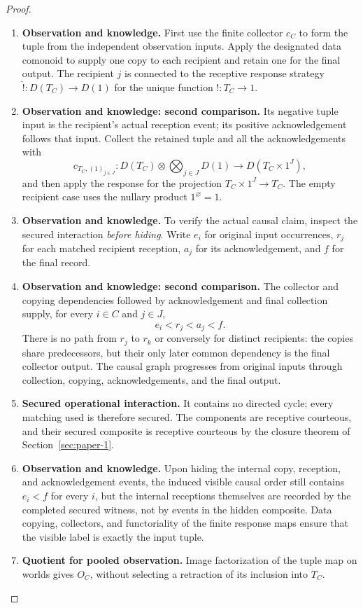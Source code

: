 \documentclass[11pt,a4paper]{article}
\numberwithin{equation}{section}
\theoremstyle{definition}
\theoremstyle{remark}
\theoremstyle{plain}
\begin{document}
\begin{proof}
\leavevmode
\begin{enumerate}[label=\textup{(\arabic*)},leftmargin=*,itemsep=4pt,topsep=3pt]
  \item \textbf{Observation and knowledge.} First use the finite collector $c_C$ to form the tuple from the
independent observation inputs. Apply the designated data comonoid to
supply one copy to each recipient and retain one for the final output. The recipient $j$ is connected to the receptive response strategy
$\widehat {!}:D(T_C)\to D(1)$ for the unique function $!:T_C\to1$.
  \item \textbf{Observation and knowledge: second comparison.} Its negative tuple input is the recipient's actual reception event;
its positive acknowledgement follows that input. Collect the retained
tuple and all the acknowledgements with
\[
 c_{T_C,(1)_{j\in J}}:
 D(T_C)\otimes\bigotimes_{j\in J}D(1)
 \longrightarrow D(T_C\times 1^J),
\]
and then apply the response for the projection $T_C\times1^J\to T_C$. The empty recipient case uses the nullary product $1^\varnothing=1$.
  \item \textbf{Observation and knowledge.} To verify the actual causal claim, inspect the secured interaction
\emph{before hiding}. Write $e_i$ for original input occurrences,
$r_j$ for each matched recipient reception, $a_j$ for its
acknowledgement, and $f$ for the final record.
  \item \textbf{Observation and knowledge: second comparison.} The collector and
copying dependencies followed by acknowledgement and final collection
supply, for every $i\in C$ and $j\in J$,
\[
 e_i<r_j<a_j<f.
\]
There is no path from $r_j$ to $r_k$ or conversely for distinct
recipients: the copies share predecessors, but their only later common
dependency is the final collector output. The causal graph progresses
from original inputs through collection, copying, acknowledgements, and
the final output.
  \item \textbf{Secured operational interaction.} It contains no directed cycle; every matching used is
therefore secured. The components are receptive courteous, and their
secured composite is receptive courteous by the closure theorem of Section~\ref{sec:paper-1}.
  \item \textbf{Observation and knowledge.} Upon hiding the internal copy, reception, and acknowledgement events,
the induced visible causal order still contains $e_i<f$ for every $i$,
but the internal receptions themselves are recorded by the completed
secured witness, not by events in the hidden composite. Data copying,
collectors, and functoriality of the finite response maps ensure that
the visible label is exactly the input tuple.
  \item \textbf{Quotient for pooled observation.} Image factorization of
the tuple map on worlds gives $O_C$, without selecting a retraction of
its inclusion into $T_C$.
\end{enumerate}
\end{proof}
\end{document}
